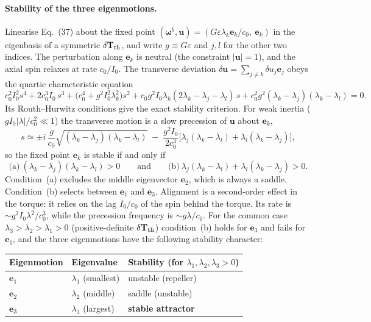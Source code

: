 \documentclass[11pt]{article}
\newcommand{\chg}[1]{\marginpar{\raggedright\footnotesize\textcolor{red!70!black}{\textsf{#1}}}}
\newcommand{\vect}[1]{\bm{#1}}
\begin{document}
\paragraph{Stability of the three eigenmotions.}\chg{C11} Linearise Eq.~(37) about the fixed point $(\vect\omega^b,\vect u)=(G\varepsilon\lambda_k\vect e_k/c_0,\ \vect e_k)$ in the eigenbasis of a symmetric $\delta\mathbf T_{\rm th}$, and write $g\equiv G\varepsilon$ and $j,l$ for the other two indices. The perturbation along $\vect e_k$ is neutral (the constraint $|\vect u|=1$), and the axial spin relaxes at rate $c_0/I_0$. The transverse deviation $\delta\vect u=\sum_{j\neq k}\delta u_j\vect e_j$ obeys the quartic characteristic equation
\begin{equation}
  c_0^2I_0^2s^4+2c_0^3I_0\,s^3+\big(c_0^4+g^2I_0^2\lambda_k^2\big)s^2+c_0g^2I_0\lambda_k(2\lambda_k-\lambda_j-\lambda_l)\,s+c_0^2g^2(\lambda_k-\lambda_j)(\lambda_k-\lambda_l)=0 .
\end{equation}
Its Routh--Hurwitz conditions give the exact stability criterion. For weak inertia ($gI_0|\lambda|/c_0^2\ll1$) the transverse motion is a slow precession of $\vect u$ about $\vect e_k$,
\begin{equation}
  s \simeq \pm i\,\frac{g}{c_0}\sqrt{(\lambda_k-\lambda_j)(\lambda_k-\lambda_l)}\;-\;\frac{g^2I_0}{2c_0^3}\Big[\lambda_j(\lambda_k-\lambda_l)+\lambda_l(\lambda_k-\lambda_j)\Big], \tag{41a}
\end{equation}
so the fixed point $\vect e_k$ is stable if and only if
\begin{equation}
  \text{(a)}\ (\lambda_k-\lambda_j)(\lambda_k-\lambda_l)>0 \qquad\text{and}\qquad \text{(b)}\ \lambda_j(\lambda_k-\lambda_l)+\lambda_l(\lambda_k-\lambda_j)>0 . \tag{41b}
\end{equation}
Condition~(a) excludes the middle eigenvector $\vect e_2$, which is always a saddle. Condition~(b) selects between $\vect e_1$ and $\vect e_3$. Alignment is a second-order effect in the torque: it relies on the lag $I_0/c_0$ of the spin behind the torque. Its rate is $\sim g^2I_0\lambda^2/c_0^3$, while the precession frequency is $\sim g\lambda/c_0$. For the common case $\lambda_3>\lambda_2>\lambda_1>0$ (positive-definite $\delta\mathbf T_{\rm th}$) condition~(b) holds for $\vect e_3$ and fails for $\vect e_1$, and the three eigenmotions have the following stability character:
\begin{center}
\begin{tabular}{lll}
\toprule
Eigenmotion & Eigenvalue & Stability (for $\lambda_1,\lambda_2,\lambda_3>0$)\\
\midrule
$\vect e_1$ & $\lambda_1$ (smallest) & unstable (repeller)\\
$\vect e_2$ & $\lambda_2$ (middle) & saddle (unstable)\\
$\vect e_3$ & $\lambda_3$ (largest) & \textbf{stable attractor}\\
\bottomrule
\end{tabular}
\end{center}
\end{document}
